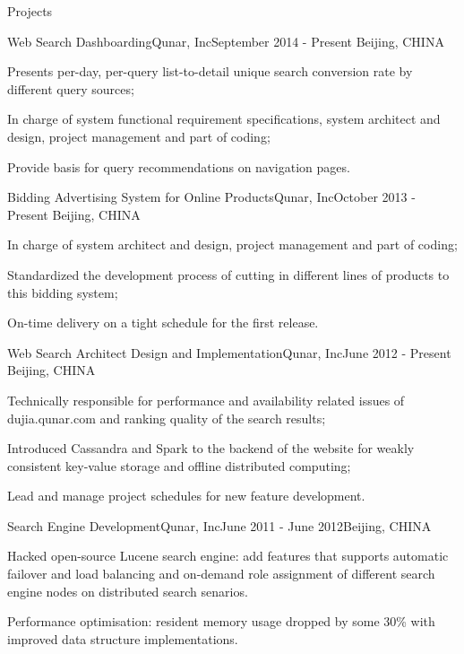 \documentclass{resume} %
\begin{document}
\begin{rSection}{Projects}

\begin{rSubsection}{Web Search Dashboarding}{Qunar, Inc}{September 2014 - Present}
{Beijing, CHINA}
\item Presents per-day, per-query list-to-detail unique search conversion rate by different query sources;
\item In charge of system functional requirement specifications, system architect and design, project management and part of coding;
\item Provide basis for query recommendations on navigation pages.
\end{rSubsection}

\begin{rSubsection}{Bidding Advertising System for Online Products}{Qunar, Inc}{October 2013 - Present}
{Beijing, CHINA}
\item In charge of system architect and design, project management and part of coding;
\item Standardized the development process of cutting in different lines of products to this bidding system;
\item On-time delivery on a tight schedule for the first release.
\end{rSubsection}

\begin{rSubsection}{Web Search Architect Design and Implementation}{Qunar, Inc}{June 2012 - Present}
{Beijing, CHINA}
\item Technically responsible for performance and availability related issues of dujia.qunar.com and ranking 
quality of the search results;
\item Introduced Cassandra and Spark to the backend of the website for weakly consistent key-value storage and offline distributed
 computing;
\item Lead and manage project schedules for new feature development.

\end{rSubsection}

\begin{rSubsection}{Search Engine Development}{Qunar, Inc}{June 2011 -
    June 2012}{Beijing, CHINA}
\item Hacked open-source Lucene search engine: add features that supports automatic failover and load balancing and on-demand role assignment of different search engine nodes on distributed search senarios.
\item Performance optimisation: resident memory usage dropped by some 30\% with improved data structure implementations.
\end{rSubsection}


\end{rSection}
\end{document}
